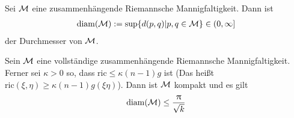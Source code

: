 \begin{defs}[Durchmesser]
Sei $\mathcal{M}$ eine zusammenhängende Riemannsche Mannigfaltigkeit.
Dann ist
\begin{align}
    \operatorname{diam} (\mathcal{M}):= \sup \{ d(p, q) \vert p, q \in \mathcal{M} \} \in (0, \infty]
\end{align}
der Durchmesser von $\mathcal{M}$.
\end{defs}

\begin{satz}
\label{satz:bonnetmyers}
Sein $\mathcal{M}$ eine vollständige zusammenhängende Riemannsche Mannigfaltigkeit.
Ferner sei $\kappa > 0$ so, dass $\text{ric} \leq \kappa (n - 1) g$ ist 
(Das heißt $\text{ric} (\xi , \eta) \geq \kappa (n - 1) g( \xi \eta)$).
Dann ist $\mathcal{M}$ kompakt und es gilt
\begin{align}
    \operatorname{diam} (\mathcal{M}) \leq \frac{\uppi}{\sqrt{k}}
\end{align}
\end{satz}

